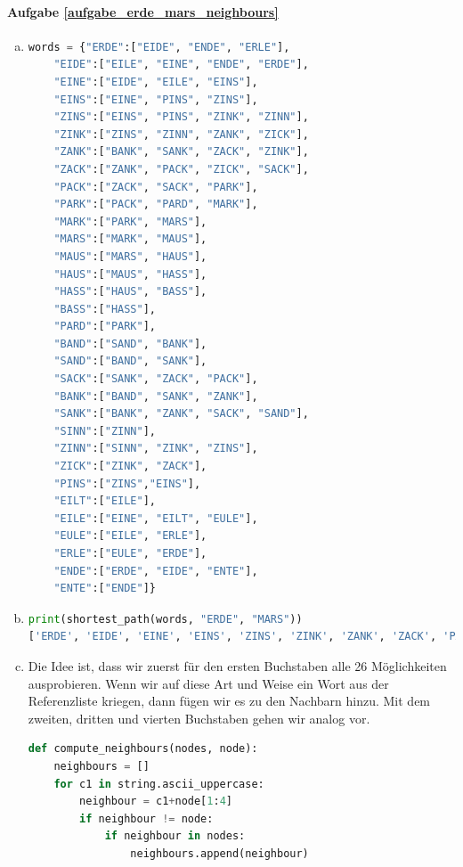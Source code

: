 \paragraph{Aufgabe \ref{aufgabe_erde_mars_neighbours}}
\begin{enumerate}[(a)]
    \item
    \begin{lstlisting}[language=Python]
words = {"ERDE":["EIDE", "ENDE", "ERLE"],
    "EIDE":["EILE", "EINE", "ENDE", "ERDE"],
    "EINE":["EIDE", "EILE", "EINS"],
    "EINS":["EINE", "PINS", "ZINS"],
    "ZINS":["EINS", "PINS", "ZINK", "ZINN"],
    "ZINK":["ZINS", "ZINN", "ZANK", "ZICK"],
    "ZANK":["BANK", "SANK", "ZACK", "ZINK"],
    "ZACK":["ZANK", "PACK", "ZICK", "SACK"],
    "PACK":["ZACK", "SACK", "PARK"],
    "PARK":["PACK", "PARD", "MARK"],
    "MARK":["PARK", "MARS"],
    "MARS":["MARK", "MAUS"],
    "MAUS":["MARS", "HAUS"],
    "HAUS":["MAUS", "HASS"],
    "HASS":["HAUS", "BASS"],
    "BASS":["HASS"],
    "PARD":["PARK"],
    "BAND":["SAND", "BANK"],
    "SAND":["BAND", "SANK"],
    "SACK":["SANK", "ZACK", "PACK"],
    "BANK":["BAND", "SANK", "ZANK"],
    "SANK":["BANK", "ZANK", "SACK", "SAND"],
    "SINN":["ZINN"],
    "ZINN":["SINN", "ZINK", "ZINS"],
    "ZICK":["ZINK", "ZACK"],
    "PINS":["ZINS","EINS"],
    "EILT":["EILE"],
    "EILE":["EINE", "EILT", "EULE"],
    "EULE":["EILE", "ERLE"],
    "ERLE":["EULE", "ERDE"],
    "ENDE":["ERDE", "EIDE", "ENTE"],
    "ENTE":["ENDE"]}
    \end{lstlisting}
    
    \item
    \begin{lstlisting}[language=Python]
print(shortest_path(words, "ERDE", "MARS"))
['ERDE', 'EIDE', 'EINE', 'EINS', 'ZINS', 'ZINK', 'ZANK', 'ZACK', 'PACK', 'PARK', 'MARK', 'MARS']
    \end{lstlisting}
    
    \item Die Idee ist, dass wir zuerst für den ersten Buchstaben alle 26 Möglichkeiten ausprobieren. Wenn wir auf diese Art und Weise ein Wort aus der Referenzliste kriegen, dann fügen wir es zu den Nachbarn hinzu. Mit dem zweiten, dritten und vierten Buchstaben gehen wir analog vor.
    \begin{lstlisting}[language=Python]
def compute_neighbours(nodes, node):
    neighbours = []
    for c1 in string.ascii_uppercase:
        neighbour = c1+node[1:4]
        if neighbour != node:
            if neighbour in nodes:
                neighbours.append(neighbour)
                

\end{lstlisting}
\end{enumerate}

